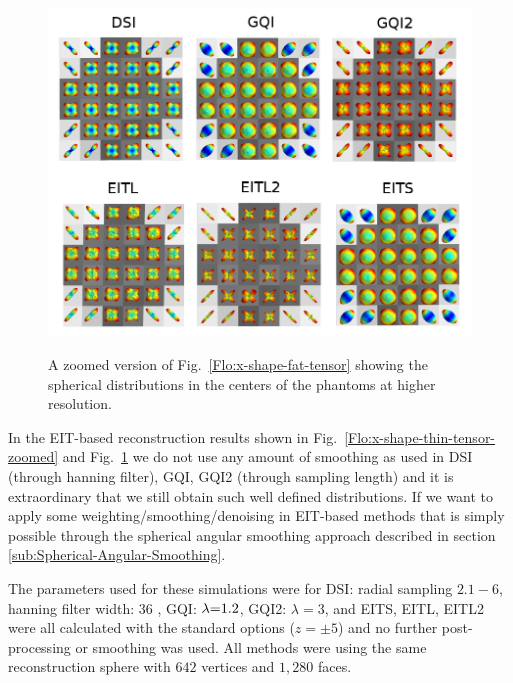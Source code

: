 \documentclass{bioinfo}
\begin{document}
%
\begin{figure}
[th]

\begin{centering}
\includegraphics[scale=1.5]{figures/software_phantom_comparisons_rician_05_fat_zoomed}
\par\end{centering}

\caption{A zoomed version of Fig.~\ref{Flo:x-shape-fat-tensor} showing the
spherical distributions in the centers of the phantoms at higher resolution.}


\centering{}\label{Flo:x-shape-fat-tensor-zoomed}
\end{figure}


In the EIT-based reconstruction results shown in Fig.~\ref{Flo:x-shape-thin-tensor-zoomed}
and Fig.~\ref{Flo:x-shape-fat-tensor-zoomed} we do not use any amount
of smoothing as used in DSI (through hanning filter), GQI, GQI2 (through
sampling length) and it is extraordinary that we still obtain such
well defined distributions. If we want to apply some weighting/smoothing/denoising
in EIT-based methods that is simply possible through the spherical
angular smoothing approach described in section \ref{sub:Spherical-Angular-Smoothing}. 

The parameters used for these simulations were for DSI: radial sampling
$2.1-6$, hanning filter width: $36$ , GQI: $\text{\ensuremath{\lambda}=1.2}$,
GQI2: $\lambda=3$, and EITS, EITL, EITL2 were all calculated with
the standard options ($z=\pm5$) and no further post-processing or
smoothing was used. All methods were using the same reconstruction
sphere with $642$ vertices and $1,280$ faces.
\end{document}
